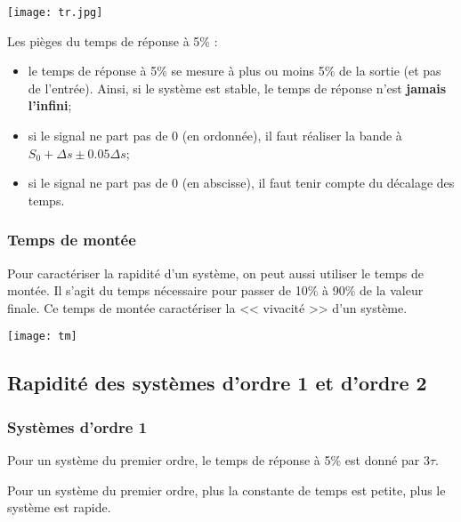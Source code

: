 \begin{marginfigure}[1cm]
\centering
\texttt{[image: tr.jpg]}
\end{marginfigure}

\begin{exemple}
Les pièges du temps de réponse à 5\% :
\begin{itemize}
\item le temps de réponse à 5\% se mesure à plus ou moins 5\% de la sortie (et pas de l'entrée). Ainsi, si le système est stable, le temps de réponse n'est \textbf{jamais l'infini};
\item si le signal ne part pas de 0 (en ordonnée), il faut réaliser la bande à $S_0+\Delta s \pm 0.05\Delta s$;
\item si le signal ne part pas de 0 (en abscisse), il faut tenir compte du décalage des temps.
\end{itemize}

\end{exemple}

\subsubsection{Temps de montée}



Pour caractériser la rapidité d'un système, on peut aussi utiliser le temps de montée. Il s'agit du temps nécessaire pour passer de 10\% à 90\% de la valeur finale. Ce temps de montée caractériser la << vivacité >> d'un système. 
\begin{marginfigure}
\centering
\texttt{[image: tm]}
\end{marginfigure}


\subsection{Rapidité des systèmes d'ordre 1 et d'ordre 2}
\subsubsection{Systèmes d'ordre 1}
Pour un système du premier ordre, le temps de réponse à 5\% est donné par $3\tau$.
\begin{resultat}
Pour un système du premier ordre, plus la constante de temps est petite, plus le système est rapide.
\end{resultat}

